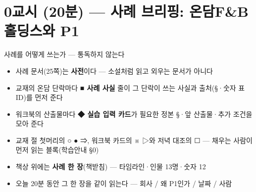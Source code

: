 \section{0교시 (20분) — 사례 브리핑: 온담F\&B홀딩스와 P1}
\begin{frame}{사례를 어떻게 쓰는가 — 통독하지 않는다}
\begin{itemize}
\item 사례 문서(25쪽)는 \textbf{사전}이다 — 소설처럼 읽고 외우는 문서가 아니다
\item 교재의 온담 단락마다 \textbf{■ 사례 사실} 줄이 그 단락이 쓰는 사실과 출처(§·숫자 표 ID)를 먼저 준다
\item 워크북의 산출물마다 \textbf{◆ 실습 입력 카드}가 필요한 정본 §·앞 산출물·추가 조건을 모아 준다
\item 교재 절 첫머리의 ○ ● ⇒, 워크북 카드의 ※ ▷와 저녁 대조의 ☐ — 채우는 사람이 먼저 읽는 블록(학습안내 §0)
\item 책상 위에는 \textbf{사례 한 장}(책받침) — 타임라인·인물 13명·숫자 12
\item 오늘 20분 동안 그 한 장을 같이 읽는다 — 회사 / 왜 P1인가 / 날짜 / 사람
\end{itemize}
\end{frame}

